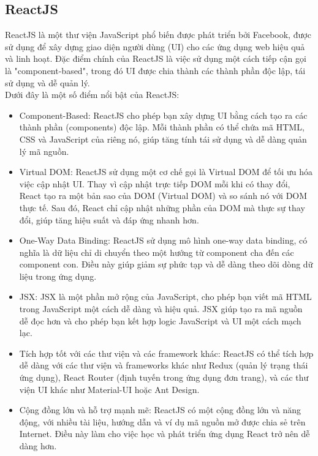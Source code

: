 \documentclass[a4paper]{article}
\begin{document}
\subsection{ReactJS}
ReactJS là một thư viện JavaScript phổ biến được phát triển bởi Facebook, được sử dụng để xây dựng giao diện người dùng (UI) cho các ứng dụng web hiệu quả và linh hoạt. Đặc điểm chính của ReactJS là việc sử dụng một cách tiếp cận gọi là "component-based", trong đó UI được chia thành các thành phần độc lập, tái sử dụng và dễ quản lý. \\

Dưới đây là một số điểm nổi bật của ReactJS:
\begin{itemize}
    \item Component-Based: ReactJS cho phép bạn xây dựng UI bằng cách tạo ra các thành phần (components) độc lập. Mỗi thành phần có thể chứa mã HTML, CSS và JavaScript của riêng nó, giúp tăng tính tái sử dụng và dễ dàng quản lý mã nguồn.
    \item Virtual DOM: ReactJS sử dụng một cơ chế gọi là Virtual DOM để tối ưu hóa việc cập nhật UI. Thay vì cập nhật trực tiếp DOM mỗi khi có thay đổi, React tạo ra một bản sao của DOM (Virtual DOM) và so sánh nó với DOM thực tế. Sau đó, React chỉ cập nhật những phần của DOM mà thực sự thay đổi, giúp tăng hiệu suất và đáp ứng nhanh hơn.
    \item One-Way Data Binding: ReactJS sử dụng mô hình one-way data binding, có nghĩa là dữ liệu chỉ di chuyển theo một hướng từ component cha đến các component con. Điều này giúp giảm sự phức tạp và dễ dàng theo dõi dòng dữ liệu trong ứng dụng.
    \item JSX: JSX là một phần mở rộng của JavaScript, cho phép bạn viết mã HTML trong JavaScript một cách dễ dàng và hiệu quả. JSX giúp tạo ra mã nguồn dễ đọc hơn và cho phép bạn kết hợp logic JavaScript và UI một cách mạch lạc.
    \item Tích hợp tốt với các thư viện và các framework khác: ReactJS có thể tích hợp dễ dàng với các thư viện và frameworks khác như Redux (quản lý trạng thái ứng dụng), React Router (định tuyến trong ứng dụng đơn trang), và các thư viện UI khác như Material-UI hoặc Ant Design.
    \item Cộng đồng lớn và hỗ trợ mạnh mẽ: ReactJS có một cộng đồng lớn và năng động, với nhiều tài liệu, hướng dẫn và ví dụ mã nguồn mở được chia sẻ trên Internet. Điều này làm cho việc học và phát triển ứng dụng React trở nên dễ dàng hơn.
\end{itemize}
\end{document}
